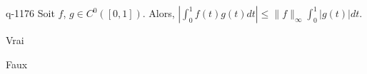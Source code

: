 \begin{truefalse}{q-1176}
Soit $f$, $g\in C^0([0,1])$. Alors, $\left|\int_0^1f(t)g(t)dt\right|\leq \|f\|_\infty \int_0^1 \left\lvert g(t) \right\rvert dt$.
\item* Vrai
\item Faux
\end{truefalse}

